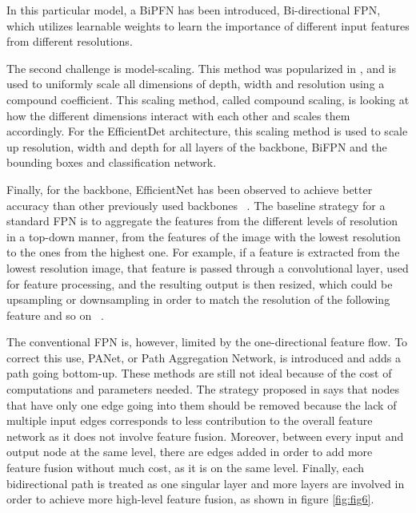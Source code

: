 In this particular model, a BiPFN has been introduced, Bi-directional FPN, which utilizes learnable weights to learn the importance of different input features from different resolutions.

The second challenge is model-scaling. This method was popularized in \cite{carte10}, and is used to uniformly scale all dimensions of depth, width and resolution using a compound coefficient. This scaling method, called compound scaling, is looking at how the different dimensions interact with each other and scales them accordingly. For the EfficientDet architecture, this scaling method is used to scale up resolution, width and depth for all layers of the backbone, BiFPN and the bounding boxes and classification network.

Finally, for the backbone, EfficientNet has been observed to achieve better accuracy than other previously used backbones ~\cite{carte8}. 
The baseline strategy for a standard FPN is to aggregate the features from the different levels of resolution in a top-down manner, from the features of the image with the lowest resolution to the ones from the highest one. For example, if a feature is extracted from the lowest resolution image, that feature is passed through a convolutional layer, used for feature processing, and the resulting output is then resized, which could be upsampling or downsampling in order to match the resolution of the following feature and so on ~\cite{carte8}.

The conventional FPN is, however, limited by the one-directional feature flow. To correct this use, PANet, or Path Aggregation Network, is introduced and adds a path going bottom-up. These methods are still not ideal because of the cost of computations and parameters needed. The strategy proposed in \cite{carte8} says that nodes that have only one edge going into them should be removed because the lack of multiple input edges corresponds to less contribution to the overall feature network as it does not involve feature fusion. Moreover, between every input and output node at the same level, there are edges added in order to add more feature fusion without much cost, as it is on the same level. Finally, each bidirectional path is treated as one singular layer and more layers are involved in order to achieve more high-level feature fusion, as shown in figure \ref{fig:fig6}.

